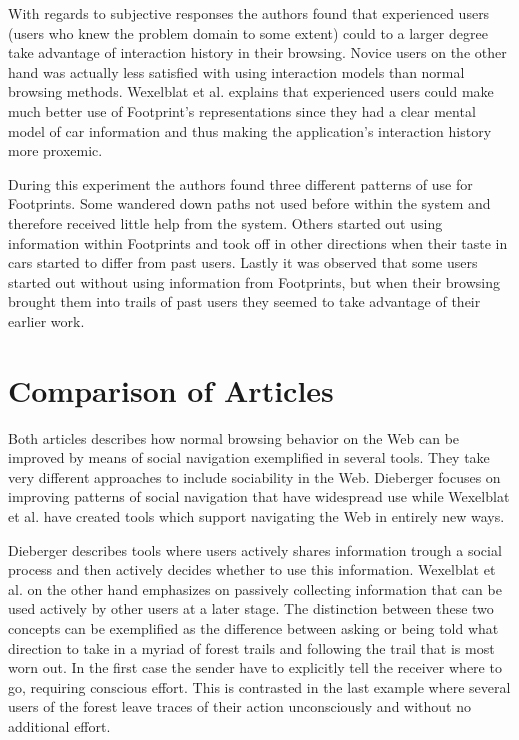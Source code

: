 \documentclass[12pt,a4paper]{article}
\begin{document}
With regards to subjective responses the authors found that experienced users
(users who knew the problem domain to some extent) could to a larger degree
take advantage of interaction history in their browsing. Novice users on the
other hand was actually less satisfied with using interaction models than
normal browsing methods. Wexelblat et al. explains that experienced users
could make much better use of Footprint's representations since they had a
clear mental model of car information and thus making the application's
interaction history more proxemic.

During this experiment the authors found three different patterns of use for
Footprints. Some wandered down paths not used before within the system and
therefore received little help from the system. Others started out using
information within Footprints and took off in other directions when their
taste in cars started to differ from past users. Lastly it was observed that
some users started out without using information from Footprints, but when
their browsing brought them into trails of past users they seemed to take
advantage of their earlier work.

\section{Comparison of Articles}

Both articles describes how normal browsing behavior on the Web can be
improved by means of social navigation exemplified in several tools. They take
very different approaches to include sociability in the Web. Dieberger focuses
on improving patterns of social navigation that have widespread use while
Wexelblat et al. have created tools which support navigating the Web in
entirely new ways.

Dieberger describes tools where users actively shares information trough a
social process and then actively decides whether to use this information.
Wexelblat et al. on the other hand emphasizes on passively collecting
information that can be used actively by other users at a later stage. The
distinction between these two concepts can be exemplified as the difference
between asking or being told what direction to take in a myriad of forest
trails and following the trail that is most worn out. In the first case the
sender have to explicitly tell the receiver where to go, requiring conscious
effort. This is contrasted in the last example where several users of the
forest leave traces of their action unconsciously and without no additional
effort.
\end{document}
